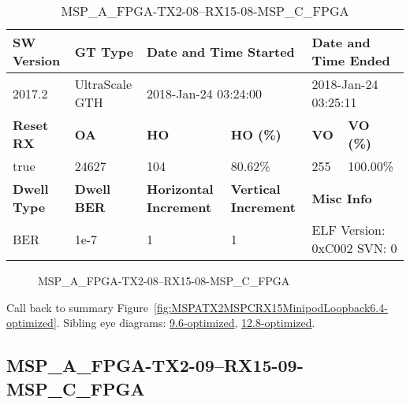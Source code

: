 \begin{table}[h]
\centering
\caption{MSP\_A\_FPGA-TX2-08--RX15-08-MSP\_C\_FPGA}
\label{tab:MSPAFPGATX208RX1508MSPCFPGA6.4-optimized}
\begin{tabular}{@{}|l|l|l|l|l|l|@{}}
\toprule
\textbf{SW Version}                & \textbf{GT Type}   & \multicolumn{2}{l|}{\textbf{Date and Time Started}}            & \multicolumn{2}{l|}{\textbf{Date and Time Ended}}        \\ \midrule
2017.2                       & UltraScale GTH          & \multicolumn{2}{l|}{2018-Jan-24 03:24:00}                   & \multicolumn{2}{l|}{2018-Jan-24 03:25:11}               \\ \midrule
\textbf{Reset RX}                  & \textbf{OA} & \textbf{HO}   & \textbf{HO (\%)} & \textbf{VO} & \textbf{VO (\%)} \\ \midrule
true & 24627        & 104          & 80.62\%        & 255        & 100.00\%       \\ \midrule
\textbf{Dwell Type}                & \textbf{Dwell BER} & \textbf{Horizontal Increment} & \textbf{Vertical Increment}    & \multicolumn{2}{l|}{\textbf{Misc Info}}                  \\ \midrule
BER                            & 1e-7        & 1        & 1           & \multicolumn{2}{l|}{ELF Version: 0xC002 SVN: 0}                         \\ \bottomrule
\end{tabular}
\end{table}

\begin{figure}[h]
\caption{MSP\_A\_FPGA-TX2-08--RX15-08-MSP\_C\_FPGA} \label{fig:MSPAFPGATX208RX1508MSPCFPGA6.4-optimized}
\end{figure}

Call back to summary Figure~\ref{fig:MSPATX2MSPCRX15MinipodLoopback6.4-optimized}.
Sibling eye diagrams: \hyperref[sec:MSPAFPGATX208RX1508MSPCFPGA9.6-optimized]{9.6-optimized}, \hyperref[sec:MSPAFPGATX208RX1508MSPCFPGA12.8-optimized]{12.8-optimized}.

\clearpage
\newpage


\subsection{MSP\_A\_FPGA-TX2-09--RX15-09-MSP\_C\_FPGA}\label{sec:MSPAFPGATX209RX1509MSPCFPGA6.4-optimized}

